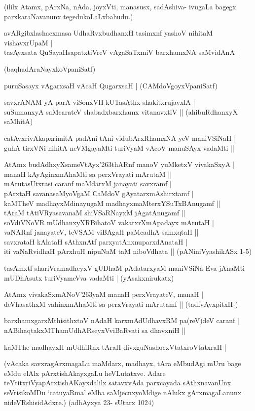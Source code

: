 \noindent
(ililx Atamx, pArxNa, nAda, joyxVti, manasusx, sadAshiva- ivugaLa bagegx parxkaraNavanunx tegedukoLaLx\-bahudu.)
\begin{itemize}
{\bf 
\item[58.] avARgibxlashacxmasa UdhaRvxbudhanxH tasimxnf yashoV nihitaM vishavxrUpaM |\\\label{152}
tasAyxsata QuSayaHsapatxtiVreV vAgaSaTxmiV barxhamxNA saMvidAnA |

\hfill{(baqhadAraNayxkoVpaniSatf)}
\item[59.] puruSasayx vAgarxsaH vAcaH QugarxsaH |\label{152}
\hfill{(CAMdoVgoyxVpaniSatf)}
\item[60.] savxrANAM yA parA viSonxVH kUTasAthx shakitxrujavxlA |\\\label{152}
suSumanxyA saMcarateV shabadxbarxhamx vitanavxtiV ||
\hfill{(ahibuRdhanxyX saMhitA)}
\item[61.] catAvxrivAkapxrimitA padAni tAni vidubArxRhamxNA yeV maniVSiNaH |\\\label{152}
guhA tirxVNi nihitA neVMgayaMti turiVyaM vAcoV manuSAyx vadaMti ||
\item[62.] AtAmx budAdhxyXsameVtAyx\char'263thARnf manoV yuMketxV vivakaSxyA |\\\label{152}
manaH kAyAginxmAhaMti sa perxVrayati mArutaM ||\\
mArutasUtxrasi caranf maMdarxM janayati savxramf |\\
pArxtaH savanasaMyoVgaM CaMdoV gAyatarxmAshirxtamf |\\
kaMTheV madhayxMdinayugaM madhayxmaMterxYSuTxBAnugamf ||\\
tAraM tAtiVRyasavanaM shiVSaRNayxM jAgatAnugamf ||\\
soVdiVNoVR mUdhanxyXRBihatoV vakatxrXmApadayx mArutaH |\\
vaNARnf janayateV, teVSAM viBAgaH paMcadhA samxqtaH ||\\
savxrataH kAlataH sAthxnAtf parxyatAnxnuparxdAnataH |\\
iti vaNaRvidhaH pArxhuH nipuNaM taM niboVdhata ||
\hfill{(pANiniVyashikASx 1-5)}
\item[63.] tasAmxtf shariVramadheyxV gUDhaM pAdatarxyaM maniVSiNa Eva jAnaMti \\\label{153}
mUDhAsutx turiVyameVva vadaMti |
\hfill{(yAsakxnirukatx)}
\item[64.] AtAmx vivakaSxmANoV\char'263yaM manaH perxVrayateV, manaH |\\\label{153}
deVhasathxM vahinxmAhaMti sa perxVrayati mArutamf ||
\hfill{(tadfvAyxpitxH-)}
\item[65.] barxhamxgarxMthisithxtoV nAdaH karxmAdUdhavxRM pa(reV)deV caranf |\\
nABihaqtakxMThamUdhARseyxVviBaRvati sa dhavxniH ||
\item[66.] kaMThe madhayxH mUdhiRnx tAraH divxguNashocxVtatxroVtatxraH |\label{153}
}
\end{itemize}
(vAcaka savxragArxmagaLu maMdarx, madhayx, tAra eMbudAgi mUru bage eMdu elAlx pArxtishAkayx\-gaLu heVLutatxve. Adare teYtitxriVyapArxtishAKayxdalilx satavxvAda parxcayada sAthxnavanUnx seVrisikoMDu `catu\-yaRma' eMba saMjecnxyoMdige nAlukx gArxmagaLanunx nideVRshisidAdxre.) (adhAyxya 23- sUtarx 1024)

